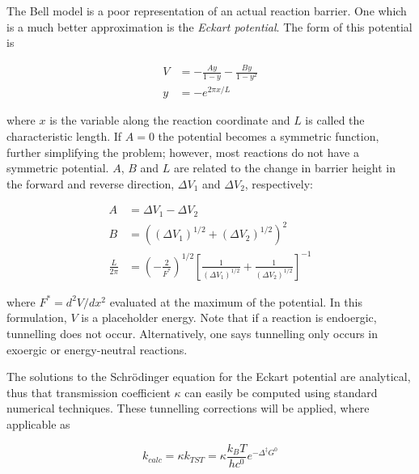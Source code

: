 The Bell model is a poor representation of an actual reaction barrier. One which is a much better approximation is the \emph{Eckart potential}.\cite{Johnston1962} The form of this potential is

\begin{align}
  V &= -\frac{Ay}{1-y} - \frac{By}{1-y^2} \\
  y &= -e^{2\pi x/L}
\end{align}

\noindent where $x$ is the variable along the reaction coordinate and $L$ is called the characteristic length. If $A=0$ the potential becomes a symmetric function, further simplifying the problem; however, most reactions do not have a symmetric potential. $A$, $B$ and $L$ are related to the change in barrier height in the forward and reverse direction, $\Delta V_1$ and $\Delta V_2$, respectively:

\begin{align}
  A &= \Delta V_1 - \Delta V_2 \\
  B &= ((\Delta V_1)^{1/2} + (\Delta V_2)^{1/2})^2 \\
 \frac{L}{2\pi} &= (-\frac{2}{F^*})^{1/2} [\frac{1}{(\Delta V_1)^{1/2}} +
      \frac{1}{(\Delta V_2)^{1/2}}]^{-1}
\end{align}

\noindent where $F^* = d^2V/dx^2$ evaluated at the maximum of the potential. In this formulation, $V$ is a placeholder energy. Note that if a reaction is endoergic, tunnelling does not occur. Alternatively, one says tunnelling only occurs in exoergic or energy-neutral reactions.

The solutions to the Schr{\"o}dinger equation for the Eckart potential are analytical, thus that transmission coefficient $\kappa$ can easily be computed using standard numerical techniques. These tunnelling corrections will be applied, where applicable as

\begin{equation}
  k_{calc} = \kappa k_{TST} = \kappa
\frac{k_B T}{hc^0}e^{-\Delta^\ddagger G^0}
\end{equation}
